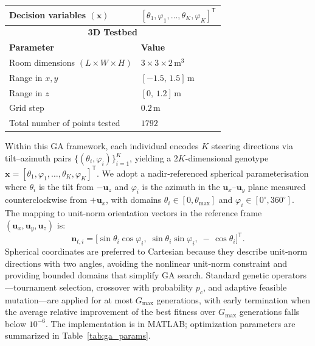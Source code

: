 \documentclass[journal]{IEEEtran}
\begin{document}
\begin{table}[tbh]
\begin{tabular}{|l|l|}
Decision variables $(\mathbf x)$    & \([\theta_{1},\varphi_{1},\dots,\theta_{K},\varphi_{K}]^{\mathsf T}\) \\ \hline
\multicolumn{2}{|c|}{\textbf{3D Testbed}} \\ \hline
\textbf{Parameter}                  & \textbf{Value}                         \\ \hline
Room dimensions \((L\times W \times H)\) & \(3 \times 3 \times 2\,\mathrm{m^3}\)  \\ \hline
Range in \(x,y\)                    & \([-1.5,\,1.5]\,\mathrm{m}\)           \\ \hline
Range in \(z\)                      & \([0,\,1.2]\,\mathrm{m}\)              \\ \hline
Grid step                           & \(0.2\,\mathrm{m}\)                    \\ \hline
Total number of points tested       & \(1792\)                               \\ \hline
\end{tabular}
\end{table}

Within this GA framework, each individual encodes \(K\) steering directions via tilt–azimuth pairs
\(\{(\theta_i,\varphi_i)\}_{i=1}^{K}\), yielding a \(2K\)-dimensional genotype
\(\mathbf x = [\theta_1,\varphi_1,\dots,\theta_K,\varphi_K]^{\mathsf T}\).
We adopt a nadir‐referenced spherical parameterisation where \(\theta_i\) is the tilt from \(-\mathbf u_z\) and \(\varphi_i\) is the azimuth in the \(\mathbf u_x\)–\( \mathbf u_y\) plane measured counterclockwise from \(+\mathbf u_x\),
with domains \(\theta_i\in[0,\theta_{\max}]\) and \(\varphi_i\in[0^\circ,360^\circ]\). %
The mapping to unit‐norm orientation vectors in the reference frame \((\mathbf u_x,\mathbf u_y,\mathbf u_z)\) is:
\begin{equation}
\mathbf n_{t,i}
= \bigl[\sin\theta_i\cos\varphi_i,\;\sin\theta_i\sin\varphi_i,\;-\,\cos\theta_i\bigr]^{\mathsf T}.
\end{equation}
Spherical coordinates are preferred to Cartesian because they describe unit‐norm directions with two angles, avoiding the nonlinear unit‐norm constraint and providing bounded domains that simplify GA search.
Standard genetic operators—tournament selection, crossover with probability \(p_c\), and adaptive feasible mutation—are applied for at most \(G_{\max}\) generations, 
with early termination when the average relative improvement of the best fitness over \(G_{\max}\) generations falls below \(10^{-6}\).
The implementation is in MATLAB; optimization parameters are summarized in Table~\ref{tab:ga_params}.
\end{document}
